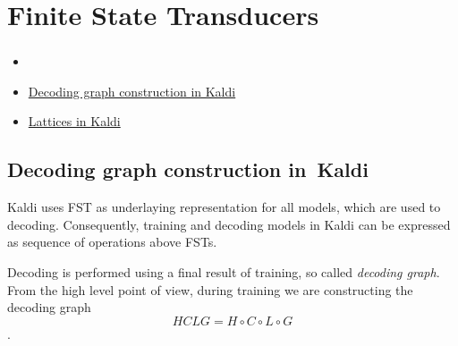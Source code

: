 








\section{Finite State Transducers} 
\label{sec:fst}



\subsubsection*{} %

\begin{itemize}
    \item {}
    \item \href{http://kaldi.sourceforge.net/graph.html} {Decoding graph construction in Kaldi}
    \item \href{http://kaldi.sourceforge.net/lattices.html} {Lattices in Kaldi}
\end{itemize}

\subsection{Decoding graph construction in~Kaldi} %
Kaldi uses \ac{FST} as underlaying representation for all models, which are used to decoding. Consequently, 
training and decoding models in Kaldi can be expressed as sequence of operations above \acp{FST}.

Decoding is performed using a final result of training, so called {\it decoding graph}. 
From the high level point of view,
during training we are constructing the decoding graph 
\begin{equation} \label{eq:hclg}
HCLG = H\circ C\circ L\circ G
\end{equation}.

